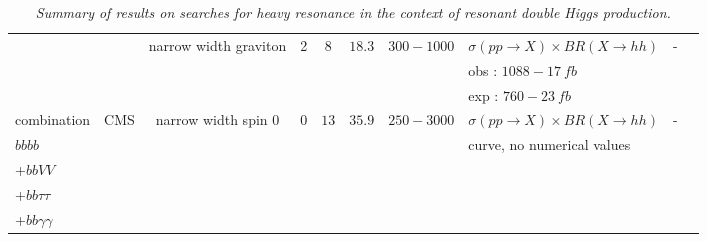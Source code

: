 \begin{table}[h!]
{\begin{tabular}{|l|l|c|c|c|c|c|l|c|c|}
\cline{3-10}
                    &        &narrow width graviton        &2    &$8$        &$18.3$        &$300-1000$        &$\sigma(pp\rightarrow X)\times BR(X\rightarrow hh)$                     &-    &\cite{Sirunyan:2017tqo}\\
                    &        &                &    &        &        &            &obs : $1088-17\ fb$                                    &    &\\
                    &        &                &    &        &        &            &exp : $760-23\ fb$                                    &    &\\
\hline
combination                &CMS        &narrow width spin 0        &0    &$13$        &$35.9$        &$250-3000$        &$\sigma(pp\rightarrow X)\times BR(X\rightarrow hh)$                     &-    &\cite{CMS:2018obr}\\
$bbbb$                    &        &                &    &        &        &            &curve, no numerical values                                &    &\\
+$bbVV$                    &        &                &    &        &        &            &                                            &    &\\
+$bb\tau\tau$                &        &                &    &        &        &            &                                            &    &\\
+$bb\gamma\gamma$            &        &                &    &        &        &            &                                            &    &\\
\hline
\end{tabular}
}
\normalsize
\caption{\normalsize\it Summary of results on searches for heavy resonance in the context of resonant double Higgs production.}
\label{Summary_analyses_searches_resonances_HH_resonant}
\end{table}









